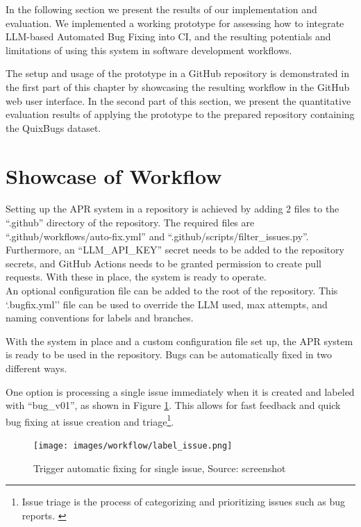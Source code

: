 In the following section we present the results of our implementation and evaluation. We implemented a working prototype for assessing how to integrate LLM-based Automated Bug Fixing into \ac{CI}, and the resulting potentials and limitations of using this system in software development workflows.

The setup and usage of the prototype in a GitHub repository is demonstrated in the first part of this chapter by showcasing the resulting workflow in the GitHub web user interface.
In the second part of this section, we present the quantitative evaluation results of applying the prototype to the prepared repository containing the QuixBugs dataset.

\section{Showcase of Workflow} \label{section:showcase}

Setting up the APR system in a repository is achieved by adding 2 files to the ``.github'' directory of the repository. The required files are ``.github/workflows/auto-fix.yml'' and ``.github/scripts/filter\_issues.py''. Furthermore, an ``LLM\_API\_KEY'' secret needs to be added to the repository secrets, and GitHub Actions needs to be granted permission to create pull requests. With these in place, the system is ready to operate.\\
An optional configuration file can be added to the root of the repository. This `.bugfix.yml'' file can be used to override the \ac{LLM} used, max attempts, and naming conventions for labels and branches.

With the system in place and a custom configuration file set up, the APR system is ready to be used in the repository. Bugs can be automatically fixed in two different ways.

One option is processing a single issue immediately when it is created and labeled with ``bug\_v01'', as shown in Figure \ref{fig:issue-trigger}. This allows for fast feedback and quick bug fixing at issue creation and triage\footnote{Issue triage is the process of categorizing and prioritizing issues such as bug reports. \cite{IssuesTriaging}}.

\begin{figure}[H]
    \centering
    \texttt{[image: images/workflow/label\_issue.png]}
    \caption{Trigger automatic fixing for single issue, Source: screenshot}
    \label{fig:issue-trigger}
\end{figure}

